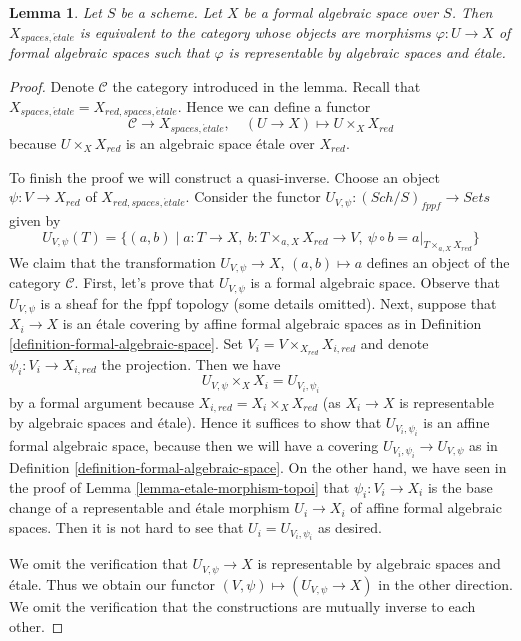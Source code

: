 \documentclass{stacks-project}
\theoremstyle{plain}
\newtheorem{lemma}[subsection]{Lemma}
\theoremstyle{definition}
\theoremstyle{remark}
\numberwithin{equation}{subsection}
\def\Sch{\mathit{Sch}}
\def\etale{{\acute{e}tale}}
\begin{document}
\begin{lemma}
\label{lemma-identify-spaces-etale}
Let $S$ be a scheme. Let $X$ be a formal algebraic space over $S$.
Then $X_{spaces, \etale}$ is equivalent to the category whose objects
are morphisms $\varphi : U \to X$ of formal algebraic spaces such that
$\varphi$ is representable by algebraic spaces and \'etale.
\end{lemma}

\begin{proof}
Denote $\mathcal{C}$ the category introduced in the lemma.
Recall that $X_{spaces, \etale} = X_{red, spaces, \etale}$.
Hence we can define a functor
$$
\mathcal{C} \longrightarrow X_{spaces, \etale},\quad
(U \to X) \longmapsto U \times_X X_{red}
$$
because $U \times_X X_{red}$ is an algebraic space \'etale over $X_{red}$.

\medskip\noindent
To finish the proof we will construct a quasi-inverse.
Choose an object $\psi : V \to X_{red}$ of $X_{red, spaces, \etale}$.
Consider the functor
$U_{V, \psi} : (\Sch/S)_{fppf} \to \textit{Sets}$ given by
$$
U_{V, \psi}(T) = \{(a, b) \mid
a : T \to X,
\ b : T \times_{a, X} X_{red} \to V,
\ \psi \circ b = a|_{T \times_{a, X} X_{red}}\}
$$
We claim that the transformation $U_{V, \psi} \to X$, $(a, b) \mapsto a$
defines an object of the category $\mathcal{C}$.
First, let's prove that $U_{V, \psi}$ is a formal algebraic space.
Observe that $U_{V, \psi}$ is a sheaf for the fppf topology (some details
omitted). Next, suppose that $X_i \to X$ is an \'etale covering by
affine formal algebraic spaces as in
Definition \ref{definition-formal-algebraic-space}.
Set $V_i = V \times_{X_{red}} X_{i, red}$ and denote
$\psi_i : V_i \to X_{i, red}$ the projection. Then 
we have
$$
U_{V, \psi} \times_X X_i = U_{V_i, \psi_i}
$$
by a formal argument because $X_{i, red} = X_i \times_X X_{red}$
(as $X_i \to X$ is representable by algebraic spaces and \'etale).
Hence it suffices to show that $U_{V_i, \psi_i}$ is an
affine formal algebraic space, because then we will have
a covering $U_{V_i, \psi_i} \to U_{V, \psi}$ as in
Definition \ref{definition-formal-algebraic-space}.
On the other hand, we have seen in the proof of
Lemma \ref{lemma-etale-morphism-topoi}
that $\psi_i : V_i \to X_i$ is the base
change of a representable and \'etale morphism
$U_i \to X_i$ of affine formal algebraic spaces.
Then it is not hard to see that $U_i = U_{V_i, \psi_i}$
as desired.

\medskip\noindent
We omit the verification that $U_{V, \psi} \to X$
is representable by algebraic spaces and \'etale.
Thus we obtain our functor $(V, \psi) \mapsto (U_{V, \psi} \to X)$
in the other direction.
We omit the verification that the constructions
are mutually inverse to each other.
\end{proof}
\end{document}
